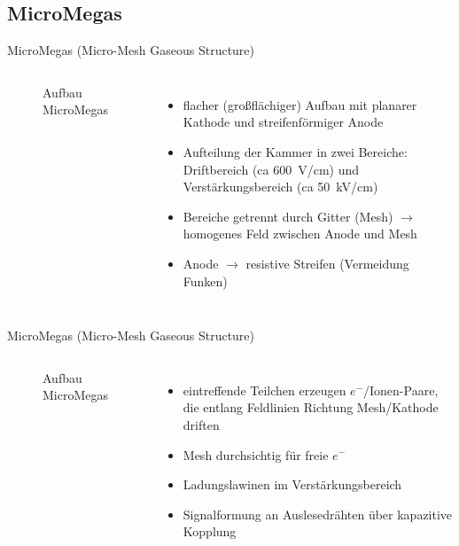 \subsection[]{MicroMegas}

\begin{frame}{MicroMegas (Micro-Mesh Gaseous Structure)}
    \begin{columns}[T]
			\begin{figure}[htbp]
			  \centering
			  
			  \caption{Aufbau MicroMegas}
			\end{figure}
			
	    	\begin{itemize}
	    	  \item flacher (großflächiger) Aufbau mit planarer Kathode und streifenförmiger Anode
	    	  \item Aufteilung der Kammer in zwei Bereiche: Driftbereich (ca 600~V/cm) und
	    	  Verstärkungsbereich (ca 50~kV/cm)
	    	  \item Bereiche getrennt durch Gitter (Mesh) $\rightarrow$ homogenes Feld zwischen Anode
	    	  und Mesh
	    	  \item Anode $\rightarrow$ resistive Streifen (Vermeidung Funken)
			\end{itemize}
    \end{columns}
\end{frame}


\begin{frame}{MicroMegas (Micro-Mesh Gaseous Structure)}
    \begin{columns}[T]
			\begin{figure}[htbp]
			  \centering
			  
			  \caption{Aufbau MicroMegas}
			\end{figure}
	    	\begin{itemize}
	    	  \item eintreffende Teilchen erzeugen $e^-$/Ionen-Paare, die entlang Feldlinien Richtung
	    	  Mesh/Kathode driften
	    	  \item Mesh durchsichtig für freie $e^-$
	    	  \item Ladungslawinen im Verstärkungsbereich
	    	  \item Signalformung an Auslesedrähten über kapazitive Kopplung
			\end{itemize}
    \end{columns}
\end{frame}

